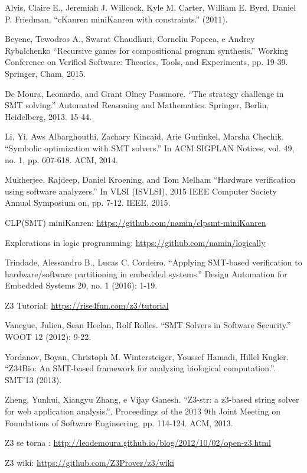 \documentclass{article}
\begin{document}
\begin{thebibliography}{99}

 Alvis, Claire E., Jeremiah J. Willcock, Kyle
  M. Carter, William E. Byrd, Daniel P. Friedman.
  ``cKanren miniKanren with constraints.'' (2011).
  
 Beyene, Tewodros A., Swarat Chaudhuri, Corneliu
  Popeea, e Andrey Rybalchenko
  ``Recursive games for compositional program synthesis.''
  Working Conference on Verified Software: Theories, Tools, and
  Experiments, pp. 19-39. Springer, Cham, 2015.

 De Moura, Leonardo, and Grant Olney Passmore.
  ``The strategy challenge in SMT solving.''
  Automated Reasoning and Mathematics. Springer, Berlin, Heidelberg,
  2013. 15-44.
  
 Li, Yi, Aws Albarghouthi, Zachary Kincaid, Arie
  Gurfinkel,  Marsha Chechik.
  ``Symbolic optimization with SMT solvers.''
  In ACM SIGPLAN Notices, vol. 49, no. 1, pp. 607-618. ACM, 2014.

 Mukherjee, Rajdeep, Daniel Kroening, and Tom
  Melham
  ``Hardware verification using software analyzers.'' In VLSI
  (ISVLSI), 2015 IEEE Computer Society Annual Symposium on,
  pp. 7-12. IEEE, 2015.

 CLP(SMT) miniKanren:
  \url{https://github.com/namin/clpsmt-miniKanren}

 Explorations in logic programming:
  \url{https://github.com/namin/logically}
  
 Trindade, Alessandro B., Lucas C. Cordeiro.
  ``Applying SMT-based verification to hardware/software partitioning
  in embedded systems.''
  Design Automation for Embedded Systems 20, no. 1 (2016): 1-19.

 Z3 Tutorial: \url{https://rise4fun.com/z3/tutorial}
  
 Vanegue, Julien, Sean Heelan, Rolf Rolles.
  ``SMT Solvers in Software Security.'' WOOT 12 (2012): 9-22.
  
 Yordanov, Boyan, Christoph M. Wintersteiger,
  Youssef Hamadi, Hillel Kugler.
  ``Z34Bio: An SMT-based framework for analyzing biological
  computation.''. SMT’13 (2013).

 Zheng, Yunhui, Xiangyu Zhang, e Vijay Ganesh.
  ``Z3-str: a z3-based string solver for web application analysis.'',
  Proceedings of the 2013 9th Joint Meeting on Foundations of
  Software Engineering, pp. 114-124. ACM, 2013. 

 Z3 se torna :
  \url{http://leodemoura.github.io/blog/2012/10/02/open-z3.html}
  
 Z3 wiki: \url{https://github.com/Z3Prover/z3/wiki}
  
\end{thebibliography}
\end{document}
